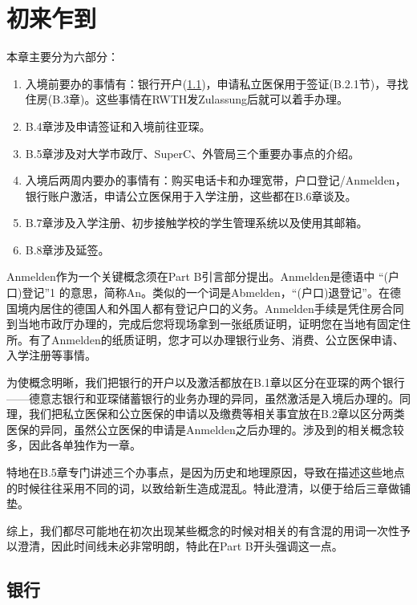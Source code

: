 
\chapter{初来乍到}

  本章主要分为六部分：

  \begin{enumerate}
    \item 入境前要办的事情有：银行开户(\ref{sec:银行})，申请私立医保用于签证(B.2.1节)，寻找住房(B.3章)。这些事情在RWTH发Zulassung后就可以着手办理。
    \item B.4章涉及申请签证和入境前往亚琛。
    \item B.5章涉及对大学市政厅、SuperC、外管局三个重要办事点的介绍。
    \item 入境后两周内要办的事情有：购买电话卡和办理宽带，户口登记/Anmelden，银行账户激活，申请公立医保用于入学注册，这些都在B.6章谈及。
    \item B.7章涉及入学注册、初步接触学校的学生管理系统以及使用其邮箱。
    \item B.8章涉及延签。
  \end{enumerate}
  
  Anmelden作为一个关键概念须在Part B引言部分提出。Anmelden是德语中 “(户口)登记”1 的意思，简称An。类似的一个词是Abmelden，“(户口)退登记”。在德国境内居住的德国人和外国人都有登记户口的义务。Anmelden手续是凭住房合同到当地市政厅办理的，完成后您将现场拿到一张纸质证明，证明您在当地有固定住所。有了Anmelden的纸质证明，您才可以办理银行业务、消费、公立医保申请、入学注册等事情。

  为使概念明晰，我们把银行的开户以及激活都放在B.1章以区分在亚琛的两个银行——德意志银行和亚琛储蓄银行的业务办理的异同，虽然激活是入境后办理的。同理，我们把私立医保和公立医保的申请以及缴费等相关事宜放在B.2章以区分两类医保的异同，虽然公立医保的申请是Anmelden之后办理的。涉及到的相关概念较多，因此各单独作为一章。

  特地在B.5章专门讲述三个办事点，是因为历史和地理原因，导致在描述这些地点的时候往往采用不同的词，以致给新生造成混乱。特此澄清，以便于给后三章做铺垫。

  综上，我们都尽可能地在初次出现某些概念的时候对相关的有含混的用词一次性予以澄清，因此时间线未必非常明朗，特此在Part B开头强调这一点。

\section{银行}\label{sec:银行}

